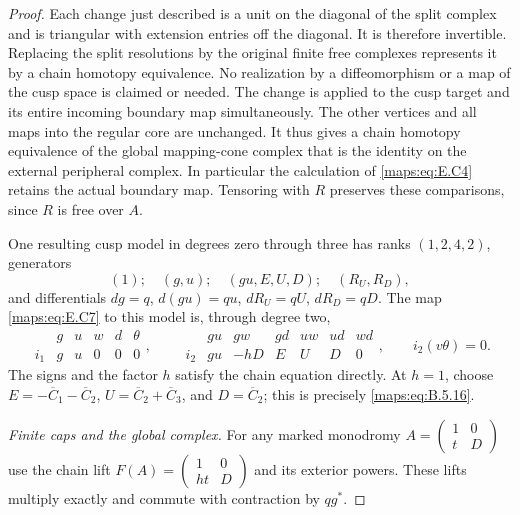 \begin{proof}
Each change just described is a unit on the diagonal
of the split complex and is triangular with extension
entries off the diagonal. It is therefore invertible.
Replacing the split resolutions by the original finite
free complexes represents it by a chain homotopy
equivalence. No realization by a diffeomorphism or a
map of the cusp space is claimed or needed. The change
is applied to the cusp target and its entire incoming
boundary map simultaneously. The other vertices and
all maps into the regular core are unchanged. It thus
gives a chain homotopy equivalence of the global
mapping-cone complex that is the identity on the
external peripheral complex. In particular the
calculation of \eqref{maps:eq:E.C4} retains the actual boundary
map. Tensoring with $R$ preserves these comparisons,
since $R$ is free over $A$.

One resulting cusp model in degrees zero through three
has ranks $(1,2,4,2)$, generators
\[
 (1);\quad(g,u);\quad(gu,E,U,D);\quad(R_U,R_D),
\]
and differentials $dg=q$, $d(gu)=qu$,
$dR_U=qU$, $dR_D=qD$. The map \eqref{maps:eq:E.C7} to this model
is, through degree two,
\[
 \begin{array}{c|ccccc}
  &g&u&w&d&\theta\\ \hline
  i_1&g&u&0&0&0
 \end{array},\qquad
 \begin{array}{c|rrrrrr}
  &gu&gw&gd&uw&ud&wd\\ \hline
  i_2&gu&-hD&E&U&D&0
 \end{array},
 \qquad i_2(v\theta)=0.
 \tag{E.C12}\label{maps:eq:E.C12}
\]
The signs and the factor $h$ satisfy the chain equation
directly. At $h=1$, choose
$E=-\overline C_1-\overline C_2$,
$U=\overline C_2+\overline C_3$, and
$D=\overline C_2$; this is precisely \eqref{maps:eq:B.5.16}.

\emph{Finite caps and the global complex.}
For any marked monodromy
$A=\left(\begin{smallmatrix}1&0\\t&D\end{smallmatrix}\right)$
use the chain lift
$F(A)=\left(\begin{smallmatrix}1&0\\ht&D\end{smallmatrix}\right)$
and its exterior powers. These lifts multiply exactly
and commute with contraction by $qg^*$.


\end{proof}
